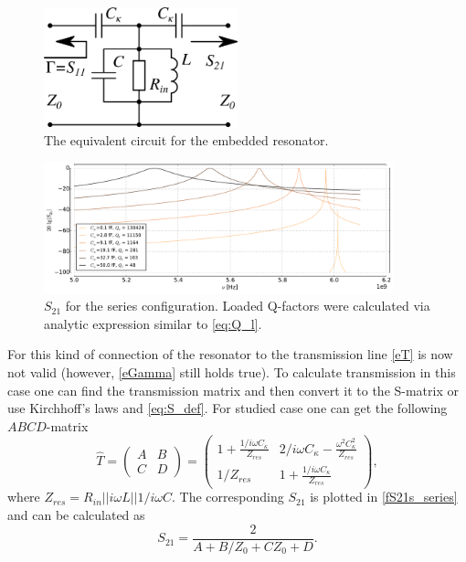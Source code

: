 \documentclass[12pt]{report}
\newcommand{\rbrkt}[1]{\left( #1 \right)}
\numberwithin{equation}{section}
\begin{document}
\begin{figure}[h]
\centering
\includegraphics[width=0.5\textwidth]{tl_scheme_series}
\caption{The equivalent circuit for the embedded resonator.}
\label{fseries_tl}
\end{figure}
\begin{figure}[h]
\centering
\includegraphics[width=0.9\textwidth]{S21s_series}
\caption{$S_{21}$ for the series configuration. Loaded Q-factors were calculated  via analytic expression similar to \eqref{eq:Q_l}.}
\label{fS21s_series}
\end{figure}

For this kind of connection of the resonator to the transmission line \eqref{eT} is now not valid (however, \eqref{eGamma} still holds true). To calculate transmission in this case one can find the transmission matrix and then convert it to the S-matrix or use Kirchhoff's laws and \eqref{eq:S_def}. For studied case one can get the following $ABCD$-matrix\cite{pozar2012}
\begin{equation}
\hat T = \rbrkt{\begin{matrix}
A & B \\
C & D
\end{matrix}} = \rbrkt{\begin{matrix}
1 + \frac{1/i\omega C_\kappa}{Z_{res}} & 2/i\omega C_\kappa - \frac{\omega^2 C_\kappa^2}{Z_{res}} \\
1/Z_{res} &  1 + \frac{1/i\omega C_\kappa}{Z_{res}} 
\end{matrix}},
\end{equation}
where $Z_{res} = R_{in}||i\omega L || 1/i\omega C$. The corresponding $S_{21}$ is  plotted in \autoref{fS21s_series} and can be calculated as\cite{pozar2012} 
\begin{equation}
S_{21} = \frac{2}{A+B/Z_0 +CZ_0 + D}.
\end{equation}
\end{document}
